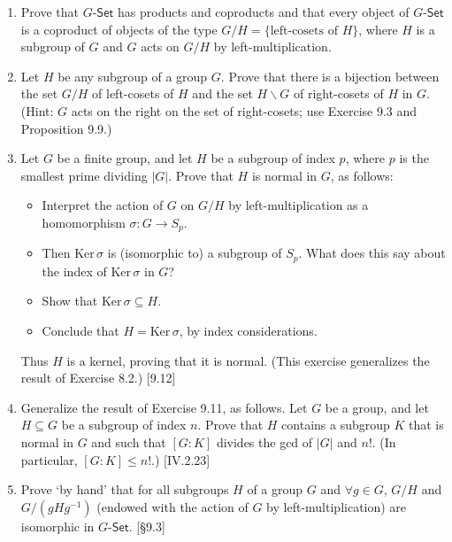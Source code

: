 \begin{enumerate}
    \item Prove that $G$-$\mathsf{Set}$ has products and coproducts and that every object of $G$-$\mathsf{Set}$ is a coproduct of objects of the type $G/H = \{\text{left-cosets of } H\}$, where $H$ is a subgroup of $G$ and $G$ acts on $G/H$ by left-multiplication.

    \item Let $H$ be any subgroup of a group $G$. Prove that there is a bijection between the set $G/H$ of left-cosets of $H$ and the set $H \backslash G$ of right-cosets of $H$ in $G$. (Hint: $G$ acts on the right on the set of right-cosets; use Exercise 9.3 and Proposition 9.9.)

    \item Let $G$ be a finite group, and let $H$ be a subgroup of index $p$, where $p$ is the smallest prime dividing $|G|$. Prove that $H$ is normal in $G$, as follows:
          \begin{itemize}
              \item Interpret the action of $G$ on $G/H$ by left-multiplication as a homomorphism $\sigma: G \to S_p$.
              \item Then $\text{Ker}\,\sigma$ is (isomorphic to) a subgroup of $S_p$. What does this say about the index of $\text{Ker}\,\sigma$ in $G$?
              \item Show that $\text{Ker}\,\sigma \subseteq H$.
              \item Conclude that $H = \text{Ker}\,\sigma$, by index considerations.
          \end{itemize}
          Thus $H$ is a kernel, proving that it is normal. (This exercise generalizes the result of Exercise 8.2.) [9.12]

    \item Generalize the result of Exercise 9.11, as follows. Let $G$ be a group, and let $H \subseteq G$ be a subgroup of index $n$. Prove that $H$ contains a subgroup $K$ that is normal in $G$ and such that $[G: K]$ divides the gcd of $|G|$ and $n!$. (In particular, $[G: K] \le n!$.) [IV.2.23]

    \item Prove `by hand' that for all subgroups $H$ of a group $G$ and $\forall g \in G$, $G/H$ and $G/(gHg^{-1})$ (endowed with the action of $G$ by left-multiplication) are isomorphic in $G$-$\mathsf{Set}$. [\S9.3]


\end{enumerate}
